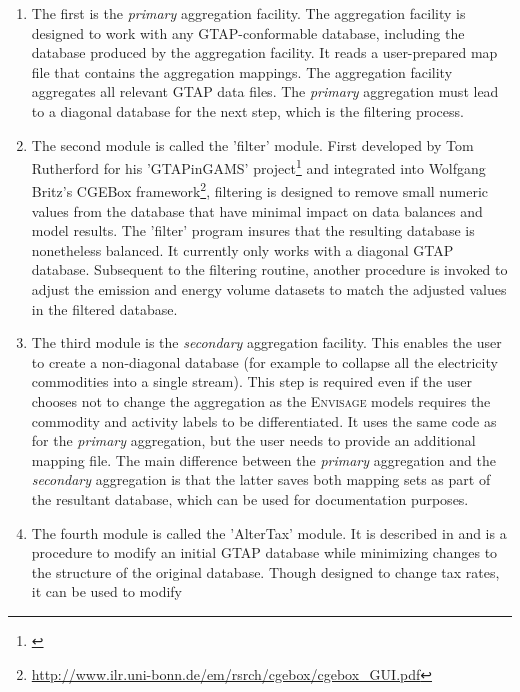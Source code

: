 \begin{enumerate}
   \item The first is the \emph{primary} aggregation facility. The
   aggregation facility is designed to work with any GTAP-conformable database, including the database produced by the aggregation facility. It reads a user-prepared map
         file that contains the aggregation mappings.
         The aggregation facility aggregates all relevant GTAP data files.
         The \emph{primary} aggregation must lead to a diagonal database for the next step,
         which is the filtering process.
   \item The second module is called the 'filter' module. First developed by Tom
         Rutherford for his 'GTAPinGAMS'
         project\footnote{\cite{LanzRutherfordJGEA2016}} and integrated into
         Wolfgang Britz's CGEBox framework\footnote{
         \url{http://www.ilr.uni-bonn.de/em/rsrch/cgebox/cgebox_GUI.pdf}},
         filtering is designed to remove small numeric values from the database
         that have minimal impact on data balances and model results. The
         'filter' program insures that the resulting database is nonetheless
         balanced. It currently only works with a diagonal GTAP database.
         Subsequent to the filtering routine, another procedure is invoked to
         adjust the emission and energy volume datasets to match the adjusted
         values in the filtered database.
   \item The third module is the \emph{secondary} aggregation facility. This enables
   the user to create a non-diagonal database (for example to collapse all the
   electricity commodities into a single stream). This step is required even if
   the user chooses not to change the aggregation as the \textsc{Envisage} models requires
   the commodity and activity labels to be differentiated. It uses the same code
   as for the \emph{primary} aggregation, but the user needs to provide
   an additional mapping file. The main difference between the \emph{primary} aggregation and
   the \emph{secondary} aggregation is that the latter saves both mapping sets as part of
   the resultant database, which can be used for documentation purposes.
   \item The fourth module is called the 'AlterTax' module. It is described in
         \cite{MalcolmGTAPTP12} and is a procedure to modify an initial GTAP
         database while minimizing changes to the structure of the original
         database. Though designed to change tax rates, it can be used to modify

\end{enumerate}
